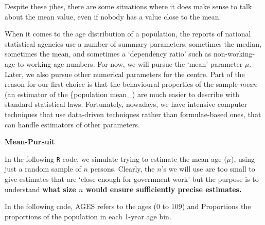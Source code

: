 \documentclass[
]{article}
\begin{document}
Despite these jibes, there are some situations where it does make sense
to talk about the mean value, even if nobody has a value close to the
mean.

When it comes to the age distribution of a population, the reports of
national statistical agencies use a number of summary parameters,
sometimes the median, sometimes the mean, and sometimes a `dependency
ratio' such as non-working-age to working-age numbers. For now, we will
pursue the `mean' parameter \(\mu\). Later, we also pursue other
numerical parameters for the centre. Part of the reason for our first
choice is that the behavioural properties of the sample \emph{mean} (an
estimator of the \{population mean\_) are much easier to describe with
standard statistical laws. Fortunately, nowadays, we have intensive
computer techniques that use data-driven techniques rather than
formulae-based ones, that can handle estimators of other parameters.

\textbf{Mean-Pursuit}

In the following \texttt{R} code, we simulate trying to estimate the
mean age (\(\mu\)), using just a random sample of \(n\) persons.
Clearly, the \(n\)'s we will use are too small to give estimates that
are `close enough for government work' but the purpose is to understand
\textbf{what size \(n\) would ensure sufficiently precise estimates.}

In the following code, AGES refers to the ages (0 to 109) and
Proportions the proportions of the population in each 1-year age bin.
\end{document}
